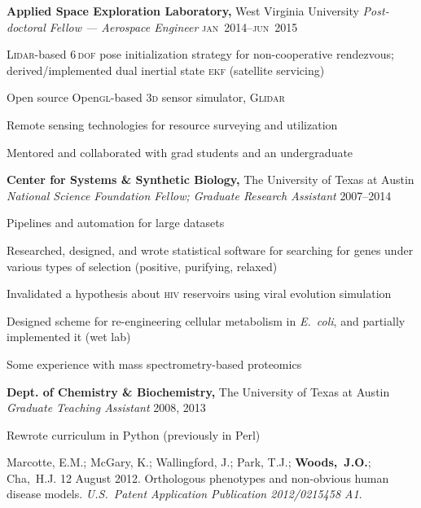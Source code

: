 \documentclass[12pt,letterpaper]{article}
\newenvironment{itemize*}%
{\begin{itemize}%
  \setlength{\itemsep}{0pt}}%
{\end{itemize}}
\newcommand{\mhead}[1]{\leavevmode\marginpar{\sffamily\footnotesize #1}}
\newcommand{\rdate}[1]{{\hfill #1}}
\begin{document}
\bigskip
\mhead{Academic \newline Appointments}%
\textbf{Applied Space Exploration Laboratory,} West Virginia University \newline
\emph{Post-doctoral Fellow --- Aerospace Engineer} \rdate{\textsc{jan}~2014--\textsc{jun}~2015}
\begin{itemize*}
  \item \textsc{Lidar}-based \textsc{6\,dof} pose initialization strategy for non-cooperative rendezvous; derived/implemented dual inertial state \textsc{ekf} (satellite servicing)%
  \item Open source Open\textsc{gl}-based \textsc{3d} sensor simulator, \textsc{Glidar}
  \item Remote sensing technologies for resource surveying and utilization
  \item Mentored and collaborated with grad students and an undergraduate
\end{itemize*}

\medskip
\textbf{Center for Systems \& Synthetic Biology,} The University of Texas at Austin\newline
\emph{National Science Foundation Fellow; Graduate Research Assistant}  \rdate{2007--2014}
\begin{itemize*}
  \item Pipelines and automation for large datasets
  \item Researched, designed, and wrote statistical software for searching for genes under various types of selection (positive, purifying, relaxed)
  \item Invalidated a hypothesis about \textsc{hiv} reservoirs using viral evolution simulation
  \item Designed scheme for re-engineering cellular metabolism in \textit{E.~coli}, and partially implemented it (wet lab)
  \item Some experience with mass spectrometry-based proteomics
\end{itemize*}

\medskip
\textbf{Dept. of Chemistry \& Biochemistry,} The University of Texas at Austin\newline
\emph{Graduate Teaching Assistant} \rdate{2008, 2013}
\begin{itemize*}
  \item Rewrote curriculum in Python (previously in Perl)
\end{itemize*}
\bigskip
\mhead{Patents}%
\par\vspace{-\baselineskip}Marcotte, E.M.; McGary, K.; Wallingford, J.; Park, T.J.; \textbf{Woods,~J.O.}; Cha,~H.J. 12 August 2012. Orthologous phenotypes and non-obvious human disease models. \textit{U.S.\ Patent Application Publication 2012/0215458 A1}.
\end{document}
